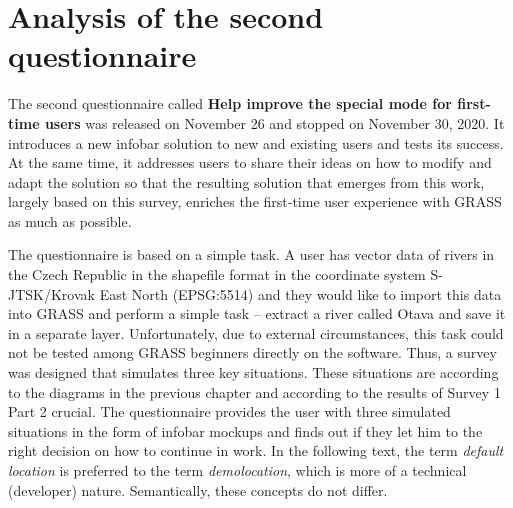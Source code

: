 \documentclass[a4paper,10pt,twoside]{article}
\begin{document}

\newpage
\vspace*{-1cm}
\section{Analysis of the second questionnaire}
\label{sec:qstat2}

\noindent The second questionnaire called \textbf{Help improve the
special mode for first-time users} was released on November 26 and
stopped on November 30, 2020. It introduces a new infobar solution to
new and existing users and tests its success. At the same time, it
addresses users to share their ideas on how to modify and adapt the 
solution so that the resulting solution that emerges from this work,
largely based on this survey, enriches the first-time user experience
with GRASS as much as possible.

The questionnaire is based on a simple task. A user has vector data of
rivers in the Czech Republic in the shapefile format in the coordinate
system S-JTSK/Krovak East North (EPSG:5514) and they would like to
import this data into GRASS and perform a simple task -- extract a river
called Otava and save it in a separate layer. Unfortunately, due
to external circumstances, this task could not be
tested among GRASS beginners directly on the software. Thus, a survey
was designed that simulates three key situations. These situations are 
according to the diagrams in the previous chapter and according to the 
results of Survey 1 Part 2 crucial. The questionnaire provides the user 
with three simulated situations in the form of infobar mockups and finds 
out if they let him to the right decision on how to continue in work.
In the following text, the term \textit{default location} is preferred to
the term \textit{demolocation}, which is more of a technical (developer) 
nature. Semantically, these concepts do not differ.
\end{document}
